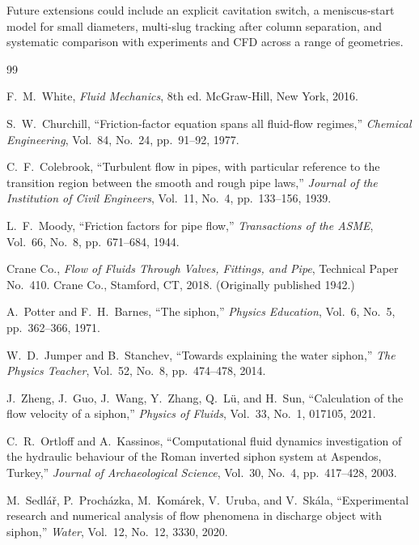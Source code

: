 \documentclass[11pt]{article}
\theoremstyle{definition}
\begin{document}
Future extensions could include an explicit cavitation switch, a meniscus-start model for 
small diameters, multi-slug tracking after column separation, and systematic comparison 
with experiments and CFD across a range of geometries.

\begin{thebibliography}{99}

F.~M.~White,
\emph{Fluid Mechanics}, 8th ed.
McGraw-Hill, New York, 2016.

S.~W.~Churchill,
``Friction-factor equation spans all fluid-flow regimes,''
\emph{Chemical Engineering}, Vol.~84, No.~24, pp.~91--92, 1977.

C.~F.~Colebrook,
``Turbulent flow in pipes, with particular reference to the transition region between 
the smooth and rough pipe laws,''
\emph{Journal of the Institution of Civil Engineers}, Vol.~11, No.~4, pp.~133--156, 1939.

L.~F.~Moody,
``Friction factors for pipe flow,''
\emph{Transactions of the ASME}, Vol.~66, No.~8, pp.~671--684, 1944.

Crane Co.,
\emph{Flow of Fluids Through Valves, Fittings, and Pipe}, Technical Paper No.~410.
Crane Co., Stamford, CT, 2018. (Originally published 1942.)

A.~Potter and F.~H.~Barnes,
``The siphon,''
\emph{Physics Education}, Vol.~6, No.~5, pp.~362--366, 1971.

W.~D.~Jumper and B.~Stanchev,
``Towards explaining the water siphon,''
\emph{The Physics Teacher}, Vol.~52, No.~8, pp.~474--478, 2014.

J.~Zheng, J.~Guo, J.~Wang, Y.~Zhang, Q.~L\"u, and H.~Sun,
``Calculation of the flow velocity of a siphon,''
\emph{Physics of Fluids}, Vol.~33, No.~1, 017105, 2021.

C.~R.~Ortloff and A.~Kassinos,
``Computational fluid dynamics investigation of the hydraulic behaviour of the Roman 
inverted siphon system at Aspendos, Turkey,''
\emph{Journal of Archaeological Science}, Vol.~30, No.~4, pp.~417--428, 2003.

M.~Sedl\'a\v{r}, P.~Proch\'azka, M.~Kom\'arek, V.~Uruba, and V.~Sk\'ala,
``Experimental research and numerical analysis of flow phenomena in discharge object 
with siphon,''
\emph{Water}, Vol.~12, No.~12, 3330, 2020.


\end{thebibliography}
\end{document}
